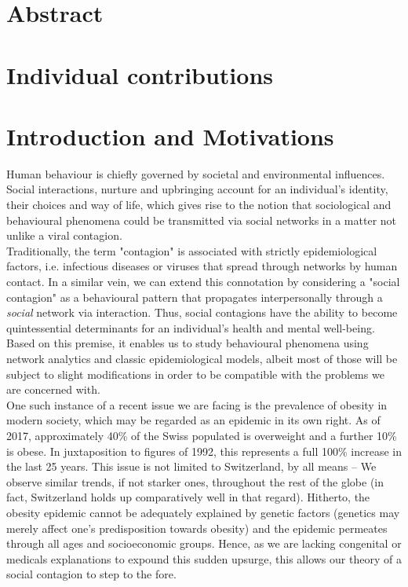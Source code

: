 \documentclass[11pt]{article}
\begin{document}
\section{Abstract}

\section{Individual contributions}

\section{Introduction and Motivations}
Human behaviour is chiefly governed by societal and environmental influences. Social interactions, nurture and upbringing account for an individual’s identity, their choices and way of life, which gives rise to the notion that sociological and behavioural phenomena could be transmitted via social networks in a matter not unlike a viral contagion.\\

Traditionally, the term "contagion" is associated with strictly epidemiological factors, i.e. infectious diseases or viruses that spread through networks by human contact. In a similar vein, we can extend this connotation by considering a "social contagion" as a behavioural pattern that propagates interpersonally through a \textit{social} network via interaction. Thus, social contagions have the ability to become quintessential determinants for an individual’s health and mental well-being. Based on this premise, it enables us to study behavioural phenomena using network analytics and classic epidemiological models, albeit most of those will be subject to slight modifications in order to be compatible with the problems we are concerned with.\\

One such instance of a recent issue we are facing is the prevalence of obesity in modern society, which may be regarded as an epidemic in its own right. As of 2017, approximately 40\% of the Swiss populated is overweight and a further 10\% is obese. In juxtaposition to figures of 1992, this represents a full 100\% increase in the last 25 years. This issue is not limited to Switzerland, by all means – We observe similar trends, if not starker ones, throughout the rest of the globe (in fact, Switzerland holds up comparatively well in that regard). Hitherto, the obesity epidemic cannot be adequately explained by genetic factors (genetics may merely affect one’s predisposition towards obesity) and the epidemic permeates through all ages and socioeconomic groups. Hence, as we are lacking congenital or medicals explanations to expound this sudden upsurge, this allows our theory of a social contagion to step to the fore.\\
\end{document}
